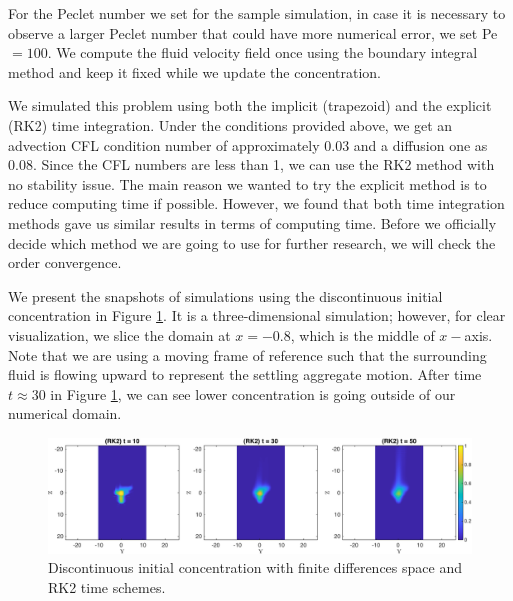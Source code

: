For the Peclet number we set for the sample simulation, in case it is necessary to observe a larger Peclet number that could have more numerical error, we set Pe $=100$.
We compute the fluid velocity field once using the boundary integral method and keep it fixed while we update the concentration. 
\par
We simulated this problem using both the implicit (trapezoid) and the explicit (RK2) time integration. Under the conditions provided above, we get an advection CFL condition number of approximately 0.03 and a diffusion one as 0.08. Since the CFL numbers are less than 1, we can use the RK2 method with no stability issue. 
The main reason we wanted to try the explicit method is to reduce computing time if possible. However, we found that both time integration methods gave us similar results in terms of computing time. Before we officially decide which method we are going to use for further research, we will check the order convergence.
\par
We present the snapshots of simulations using the discontinuous initial concentration in Figure \ref{fig_ic4_RK2_snap135}. It is a three-dimensional simulation; however, for clear visualization, we slice the domain at $x= -0.8$, which is the middle of $x-$axis.
 Note that we are using a moving frame of reference such that the surrounding fluid is flowing upward to represent the settling aggregate motion.
After time $t \approx 30$ in Figure \ref{fig_ic4_RK2_snap135}, we can see lower concentration is going outside of our numerical domain.  
 \begin{figure}[h]
 \begin{center}
	\includegraphics[scale=0.75]{./figures/fig_ic4_RK2_snap135}
 \end{center}
 \caption{Discontinuous initial concentration with finite differences space and RK2 time schemes.}
 \label{fig_ic4_RK2_snap135}
 \end{figure}
 
